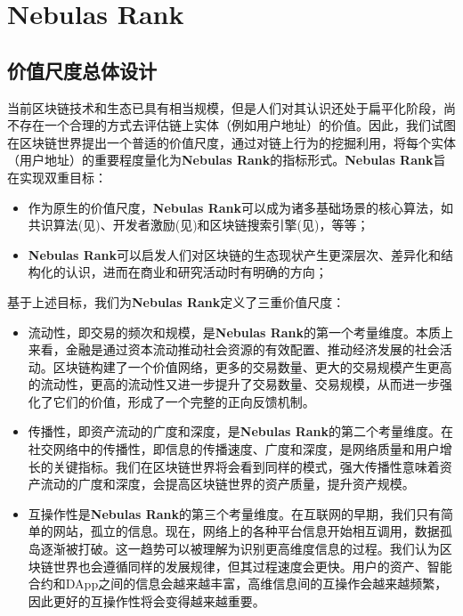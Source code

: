 \section{Nebulas Rank}
\label{sec:rank}

\subsection{价值尺度总体设计} \label{subsec:value}
当前区块链技术和生态已具有相当规模，但是人们对其认识还处于扁平化阶段，尚不存在一个合理的方式去评估链上实体（例如用户地址）的价值。因此，我们试图在区块链世界提出⼀个普适的价值尺度，通过对链上行为的挖掘利用，将每个实体（用户地址）的重要程度量化为\textbf{Nebulas Rank}的指标形式。\textbf{Nebulas Rank}旨在实现双重目标：
\begin{itemize}
	\item 作为原生的价值尺度，\textbf{Nebulas Rank}可以成为诸多基础场景的核心算法，如共识算法(见)、开发者激励(见)和区块链搜索引擎(见)，等等；
	\item \textbf{Nebulas Rank}可以启发人们对区块链的生态现状产生更深层次、差异化和结构化的认识，进而在商业和研究活动时有明确的方向；
\end{itemize}
基于上述目标，我们为\textbf{Nebulas Rank}定义了三重价值尺度：
\begin{itemize}
	\item 流动性，即交易的频次和规模，是\textbf{Nebulas Rank}的第⼀个考量维度。本质上来看，⾦融是通过资本流动推动社会资源的有效配置、推动经济发展的社会活动。区块链构建了⼀个价值⽹络，更多的交易数量、更⼤的交易规模产⽣更⾼的流动性，更⾼的流动性⼜进⼀步提升了交易数量、交易规模，从⽽进⼀步强化了它们的价值，形成了⼀个完整的正向反馈机制。 
	\item 传播性，即资产流动的⼴度和深度，是\textbf{Nebulas Rank}的第⼆个考量维度。在社交网络中的传播性，即信息的传播速度、⼴度和深度，是⽹络质量和⽤户增长的关键指标。我们在区块链世界将会看到同样的模式，强⼤传播性意味着资产流动的⼴度和深度，会提⾼区块链世界的资产质量，提升资产规模。
	\item 互操作性是\textbf{Nebulas Rank}的第三个考量维度。在互联⽹的早期，我们只有简单的⽹站，孤⽴的信息。现在，⽹络上的各种平台信息开始相互调⽤，数据孤岛逐渐被打破。这⼀趋势可以被理解为识别更⾼维度信息的过程。我们认为区块链世界也会遵循同样的发展规律，但其过程速度会更快。⽤户的资产、智能合约和DApp之间的信息会越来越丰富，⾼维信息间的互操作会越来越频繁，因此更好的互操作性将会变得越来越重要。 
\end{itemize}

